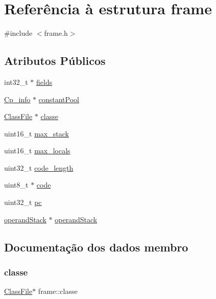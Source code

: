 \hypertarget{structframe}{}\section{Referência à estrutura frame}
\label{structframe}


{\ttfamily \#include $<$frame.\+h$>$}

\subsection*{Atributos Públicos}
\begin{DoxyCompactItemize}
\item 
int32\+\_\+t $\ast$ \hyperlink{structframe_abd74d70b2c953c57da3820ef8bfd152f}{fields}
\item 
\hyperlink{struct_cp__info}{Cp\+\_\+info} $\ast$ \hyperlink{structframe_a40e472a4fefc83b9b6920b4c3d0c3b89}{constant\+Pool}
\item 
\hyperlink{struct_class_file}{Class\+File} $\ast$ \hyperlink{structframe_ac199820b516dd4d579068706cd43af95}{classe}
\item 
uint16\+\_\+t \hyperlink{structframe_a21004a70deb96c08f1dd6fd30f610b51}{max\+\_\+stack}
\item 
uint16\+\_\+t \hyperlink{structframe_afff6c0343d82c67273a7c92f582f7ba8}{max\+\_\+locals}
\item 
uint32\+\_\+t \hyperlink{structframe_a2a43626ab33a7b6ed584eb7a47fc93e8}{code\+\_\+length}
\item 
uint8\+\_\+t $\ast$ \hyperlink{structframe_a248713b5b9384b4d3edd365ee82625b4}{code}
\item 
uint32\+\_\+t \hyperlink{structframe_a5915ace0f09c12110a4571ac827baf44}{pc}
\item 
\hyperlink{structoperand_stack}{operand\+Stack} $\ast$ \hyperlink{structframe_a2247e2a31594f7c5b3f6de0f6dc4ca18}{operand\+Stack}
\end{DoxyCompactItemize}


\subsection{Documentação dos dados membro}
\hypertarget{structframe_ac199820b516dd4d579068706cd43af95}{}\label{structframe_ac199820b516dd4d579068706cd43af95} 
\subsubsection{\texorpdfstring{classe}{classe}}
{\footnotesize\ttfamily \hyperlink{struct_class_file}{Class\+File}$\ast$ frame\+::classe}

